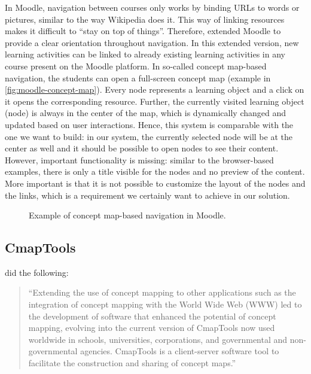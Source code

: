 In Moodle, navigation between courses only works by binding URLs to words or pictures, similar to the way Wikipedia does it. This way of linking resources makes it difficult to  ``stay on top of things''. Therefore, \cite{scherl2012moodle} extended Moodle to provide a clear orientation throughout navigation. In this extended version, new learning activities can be linked to already existing learning activities in any course present on the Moodle platform. In so-called concept map-based navigation, the students can open a full-screen concept map (example in \autoref{fig:moodle-concept-map}). Every node represents a learning object and a click on it opens the corresponding resource. Further, the currently visited learning object (node) is always in the center of the map, which is dynamically changed and updated based on user interactions. Hence, this system is comparable with the one we want to build: in our system, the currently selected node will be at the center as well and it should be possible to open nodes to see their content. However, important functionality is missing: similar to the browser-based examples, there is only a title visible for the nodes and no preview of the content. More important is that it is not possible to customize the layout of the nodes and the links, which is a requirement we certainly want to achieve in our solution.

\begin{figure}[H]
	\centering
	\caption{Example of concept map-based navigation in Moodle.}
	\label{fig:moodle-concept-map}
\end{figure}


\subsection{CmapTools}
\cite{novak2006conceptmapping} did the following:
\begin{quote}
	``Extending the use of concept mapping to other applications such as the integration of concept mapping with the World Wide Web (WWW) led to the development of software that enhanced the potential of concept mapping, evolving into the current version of CmapTools now used worldwide in schools, universities, corporations, and governmental and non-governmental agencies. CmapTools is a client-server software tool to facilitate the construction and sharing of concept maps.''
\end{quote}


